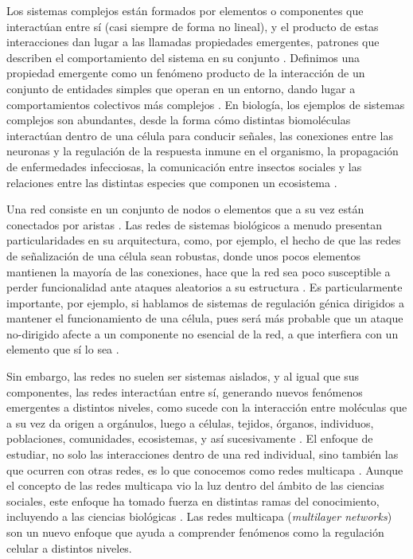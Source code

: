 \documentclass[
]{book}
\begin{document}
Los sistemas complejos están formados por elementos o componentes que interactúan entre sí (casi siempre de forma no lineal), y el producto de estas interacciones dan lugar a las llamadas propiedades emergentes, patrones que describen el comportamiento del sistema en su conjunto \citep{baas1994emergence}. Definimos una propiedad emergente como un fenómeno producto de la interacción de un conjunto de entidades simples que operan en un entorno, dando lugar a comportamientos colectivos más complejos \citep{lewes1891problems}. En biología, los ejemplos de sistemas complejos son abundantes, desde la forma cómo distintas biomoléculas interactúan dentro de una célula para conducir señales, las conexiones entre las neuronas y la regulación de la respuesta inmune en el organismo, la propagación de enfermedades infecciosas, la comunicación entre insectos sociales y las relaciones entre las distintas especies que componen un ecosistema \citep{mason2007graph}.

Una red consiste en un conjunto de nodos o elementos que a su vez están conectados por aristas \citep{mason2007graph}. Las redes de sistemas biológicos a menudo presentan particularidades en su arquitectura, como, por ejemplo, el hecho de que las redes de señalización de una célula sean robustas, donde unos pocos elementos mantienen la mayoría de las conexiones, hace que la red sea poco susceptible a perder funcionalidad ante ataques aleatorios a su estructura \citep{stelling2004robustness}. Es particularmente importante, por ejemplo, si hablamos de sistemas de regulación génica dirigidos a mantener el funcionamiento de una célula, pues será más probable que un ataque no-dirigido afecte a un componente no esencial de la red, a que interfiera con un elemento que sí lo sea \citep{stelling2004robustness}.

Sin embargo, las redes no suelen ser sistemas aislados, y al igual que sus componentes, las redes interactúan entre sí, generando nuevos fenómenos emergentes a distintos niveles, como sucede con la interacción entre moléculas que a su vez da origen a orgánulos, luego a células, tejidos, órganos, individuos, poblaciones, comunidades, ecosistemas, y así sucesivamente \citep{liu2011controllability}. El enfoque de estudiar, no solo las interacciones dentro de una red individual, sino también las que ocurren con otras redes, es lo que conocemos como redes multicapa \citep{liu2011controllability}. Aunque el concepto de las redes multicapa vio la luz dentro del ámbito de las ciencias sociales, este enfoque ha tomado fuerza en distintas ramas del conocimiento, incluyendo a las ciencias biológicas \citep{zheng2019control}. Las redes multicapa (\emph{multilayer networks}) son un nuevo enfoque que ayuda a comprender fenómenos como la regulación celular a distintos niveles.
\end{document}
